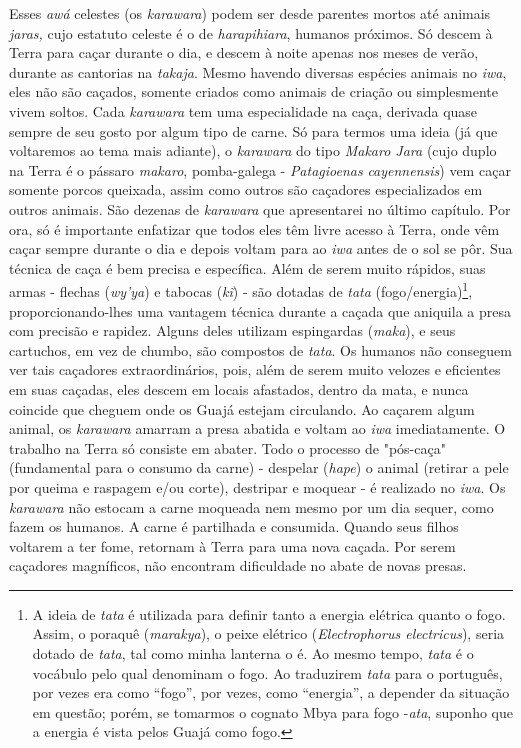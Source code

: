 Esses \emph{awá} celestes (os \emph{karawara}) podem ser desde parentes
mortos até animais \emph{jaras,} cujo estatuto celeste é o de
\emph{harapihiara}, humanos próximos. Só descem à Terra para caçar
durante o dia, e descem à noite apenas nos meses de verão, durante as
cantorias na \emph{takaja}. Mesmo havendo diversas espécies animais no
\emph{iwa}, eles não são caçados, somente criados como animais de
criação ou simplesmente vivem soltos. Cada \emph{karawara} tem uma
especialidade na caça, derivada quase sempre de seu gosto por algum tipo
de carne. Só para termos uma ideia (já que voltaremos ao tema mais
adiante), o \emph{karawara} do tipo \emph{Makaro Jara} (cujo duplo na
Terra é o pássaro \emph{makaro}, pomba-galega - \emph{Patagioenas}
\emph{cayennensis}) vem caçar somente porcos queixada, assim como outros
são caçadores especializados em outros animais. São dezenas de
\emph{karawara} que apresentarei no último capítulo. Por ora, só é
importante enfatizar que todos eles têm livre acesso à Terra, onde vêm
caçar sempre durante o dia e depois voltam para ao \emph{iwa} antes de o
sol se pôr. Sua técnica de caça é bem precisa e específica. Além de
serem muito rápidos, suas armas - flechas (\emph{wy'ya}) e tabocas
(\emph{kĩ}) - são dotadas de \emph{tata} (fogo/energia)\footnote{A ideia
  de \emph{tata} é utilizada para definir tanto a energia elétrica
  quanto o fogo. Assim, o poraquê (\emph{marakya}), o peixe elétrico
  (\emph{Electrophorus electricus}), seria dotado de \emph{tata}, tal
  como minha lanterna o é. Ao mesmo tempo, \emph{tata} é o vocábulo pelo
  qual denominam o fogo. Ao traduzirem \emph{tata} para o português, por
  vezes era como ``fogo'', por vezes, como ``energia'', a depender da
  situação em questão; porém, se tomarmos o cognato Mbya para fogo
  -\emph{ata}, suponho que a {energia} é vista pelos Guajá como {fogo}.},
proporcionando-lhes uma vantagem técnica durante a caçada que aniquila a
presa com precisão e rapidez. Alguns deles utilizam espingardas
(\emph{maka}), e seus cartuchos, em vez de chumbo, são compostos de
\emph{tata}. Os humanos não conseguem ver tais caçadores
extraordinários, pois, além de serem muito velozes e eficientes em suas
caçadas, eles descem em locais afastados, dentro da mata, e nunca
coincide que cheguem onde os Guajá estejam circulando. Ao caçarem algum
animal, os \emph{karawara} amarram a presa abatida e voltam ao
\emph{iwa} imediatamente. O trabalho na Terra só consiste em abater.
Todo o processo de "pós-caça" (fundamental para o consumo da carne) -
despelar (\emph{hape}) o animal (retirar a pele por queima e raspagem
e/ou corte), destripar e moquear - é realizado no \emph{iwa}. Os
\emph{karawara} não estocam a carne moqueada nem mesmo por um dia
sequer, como fazem os humanos. A carne é partilhada e consumida. Quando
seus filhos voltarem a ter fome, retornam à Terra para uma nova caçada.
Por serem caçadores magníficos, não encontram dificuldade no abate de
novas presas.

